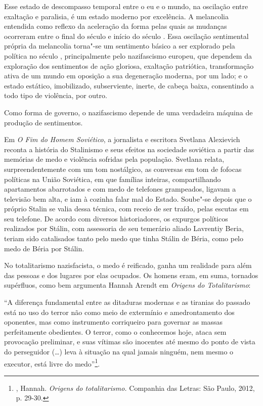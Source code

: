 Esse estado de descompasso temporal entre o eu e o mundo, na oscilação
entre exaltação e paralisia, é um estado moderno por excelência. A
melancolia entendida como reflexo da aceleração da forma pelas quais as
mudanças ocorreram entre o final do século  e início do século .
Essa oscilação sentimental própria da melancolia torna"-se um sentimento
básico a ser explorado pela política no século , principalmente pelo
nazifascismo europeu, que dependem da exploração dos sentimentos de ação
gloriosa, exaltação patriótica, transformação ativa de um mundo em
oposição a sua degeneração moderna, por um lado; e o estado estático,
imobilizado, subserviente, inerte, de cabeça baixa, consentindo a todo
tipo de violência, por outro.

Como forma de governo, o nazifascismo depende de uma verdadeira máquina
de produção de sentimentos.

\asterisc

Em \emph{O Fim do Homem Soviético}, a jornalista e escritora Svetlana
Alexievich reconta a história do Stalinismo e seus efeitos na sociedade
soviética a partir das memórias de medo e violência sofridas pela
população. Svetlana relata, surpreendentemente com um tom nostálgico, as
conversas em tom de fofocas políticas na União Soviética, em que
famílias inteiras, compartilhando apartamentos abarrotados e com medo de
telefones grampeados, ligavam a televisão bem alta, e iam à cozinha
falar mal do Estado. Soube"-se depois que o próprio Stalin se valia dessa
técnica, com receio de ser traído, pelas escutas em seu telefone. De
acordo com diversos historiadores, os expurgos políticos realizados por
Stálin, com assessoria de seu temerário aliado Lavrentiy Beria, teriam
sido catalisados tanto pelo medo que tinha Stálin de Béria, como pelo
medo de Béria por Stálin.

No totalitarismo nazisfacista, o medo é reificado, ganha um realidade
para além das pessoas e dos lugares por elas ocupados. Os homens eram,
em suma, tornados supérfluos, como bem argumenta Hannah Arendt em
\emph{Origens do Totalitarismo}:

``A diferença fundamental entre as ditaduras modernas e as tiranias do
passado está no uso do terror não como meio de extermínio e
amedrontamento dos oponentes, mas como instrumento corriqueiro para
governar as massas perfeitamente obedientes. O terror, como o conhecemos
hoje, ataca sem provocação preliminar, e suas vítimas são inocentes até
mesmo do ponto de vista do perseguidor (\ldots{}) leva à situação na qual
jamais ninguém, nem mesmo o executor, está livre do medo''\footnote{,
  Hannah. \emph{Origens do totalitarismo.} Companhia das Letras: São
  Paulo, 2012, p. 29-30.}.

